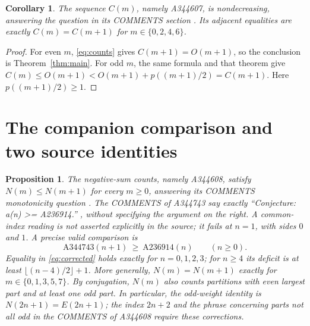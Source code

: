 \documentclass[11pt]{article}
\newtheorem{corollary}[theorem]{Corollary}
\newtheorem{proposition}[theorem]{Proposition}
\begin{document}
\begin{corollary}\label{cor:mono}
The sequence $C(m)$, namely A344607, is nondecreasing,
answering the question in its COMMENTS section \cite{a344607}.
Its adjacent equalities are exactly
$C(m)=C(m+1)$ for $m\in\{0,2,4,6\}$.
\end{corollary}
\begin{proof}
For even $m$, \eqref{eq:counts} gives $C(m+1)=O(m+1)$,
so the conclusion is Theorem~\ref{thm:main}.
For odd $m$, the same formula and that theorem give
$C(m)\le O(m+1)<O(m+1)+p((m+1)/2)=C(m+1)$.
Here $p((m+1)/2)\ge1$.
\end{proof}

\section{The companion comparison and two source identities}
\begin{proposition}\label{prop:negative}
The negative-sum counts, namely A344608, satisfy
$N(m)\le N(m+1)$ for every $m\ge0$, answering its COMMENTS
monotonicity question \cite{a344608}.
The COMMENTS of A344743 say exactly ``Conjecture: a(n) >= A236914.''
\cite{a344743}, without specifying the argument on the right.
A common-index reading is not asserted explicitly in the source;
it fails at $n=1$, with sides $0$ and $1$.
A precise valid comparison is
\begin{equation}\label{eq:corrected}
 \mathrm{A344743}(n+1)\ \ge\ \mathrm{A236914}(n)
 \qquad(n\ge0).
\end{equation}
Equality in \eqref{eq:corrected} holds exactly for $n=0,1,2,3$;
for $n\ge4$ its deficit is at least $\lfloor(n-4)/2\rfloor+1$.
More generally, $N(m)=N(m+1)$ exactly for
$m\in\{0,1,3,5,7\}$.
By conjugation, $N(m)$ also counts partitions with even largest part
and at least one odd part. In particular, the odd-weight identity is
$N(2n+1)=E(2n+1)$; the index $2n+2$ and the phrase concerning parts
not all odd in the COMMENTS of A344608 require these corrections.
\end{proposition}
\end{document}
